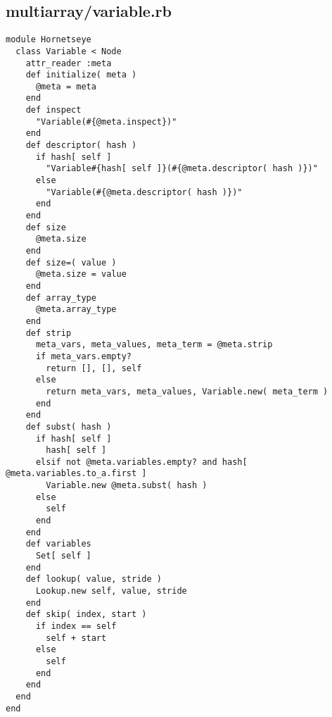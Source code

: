 \subsection{multiarray/variable.rb}\label{cha:multiarray-variable-rb}
\begin{lstlisting}
module Hornetseye
  class Variable < Node
    attr_reader :meta
    def initialize( meta )
      @meta = meta
    end
    def inspect
      "Variable(#{@meta.inspect})"
    end
    def descriptor( hash )
      if hash[ self ]
        "Variable#{hash[ self ]}(#{@meta.descriptor( hash )})"
      else
        "Variable(#{@meta.descriptor( hash )})"
      end
    end
    def size
      @meta.size
    end
    def size=( value )
      @meta.size = value
    end
    def array_type
      @meta.array_type
    end
    def strip
      meta_vars, meta_values, meta_term = @meta.strip
      if meta_vars.empty?
        return [], [], self
      else
        return meta_vars, meta_values, Variable.new( meta_term )
      end
    end
    def subst( hash )
      if hash[ self ]
        hash[ self ]
      elsif not @meta.variables.empty? and hash[ @meta.variables.to_a.first ]
        Variable.new @meta.subst( hash )
      else
        self
      end
    end
    def variables
      Set[ self ]
    end
    def lookup( value, stride )
      Lookup.new self, value, stride
    end
    def skip( index, start )
      if index == self
        self + start
      else
        self
      end
    end
  end
end
\end{lstlisting}
